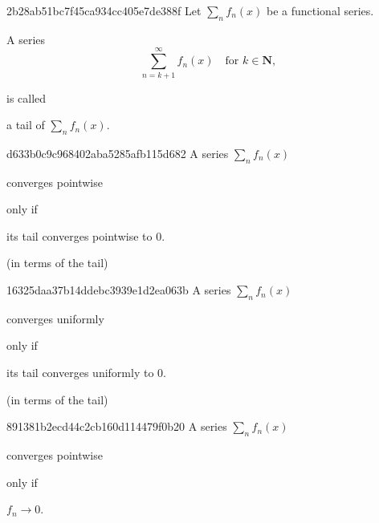 \begin{note}{2b28ab51bc7f45ca934cc405e7de388f}
    Let \({ \sum_n f_n(x) }\) be a functional series.
    \begin{icloze}{1}
        A series
        \[
            \sum_{n=k+1}^{\infty} f_n(x) \quad \text{for } k \in \mathbf{N},
        \]
    \end{icloze}
    is called \begin{icloze}{2}a tail of \({ \sum_n f_n(x) }\).\end{icloze}
\end{note}

\begin{note}{d633b0c9c968402aba5285afb115d682}
    A series \({ \sum_n f_n(x) }\) \begin{icloze}{2}converges pointwise\end{icloze} \begin{icloze}{3}only if\end{icloze} \begin{icloze}{1}its tail converges pointwise to \({ 0 }\).\end{icloze}

    \begin{center}
        \tiny
        (in terms of the tail)
    \end{center}
\end{note}

\begin{note}{16325daa37b14ddebc3939e1d2ea063b}
    A series \({ \sum_n f_n(x) }\) \begin{icloze}{2}converges uniformly\end{icloze} \begin{icloze}{3}only if\end{icloze} \begin{icloze}{1}its tail converges uniformly to \({ 0 }\).\end{icloze}

    \begin{center}
        \tiny
        (in terms of the tail)
    \end{center}
\end{note}

\begin{note}{891381b2ecd44c2cb160d114479f0b20}
    A series \({ \sum_n f_n(x) }\) \begin{icloze}{2}converges pointwise\end{icloze} \begin{icloze}{3}only if\end{icloze} \begin{icloze}{1}\({ f_n \to 0 }\).\end{icloze}
\end{note}

